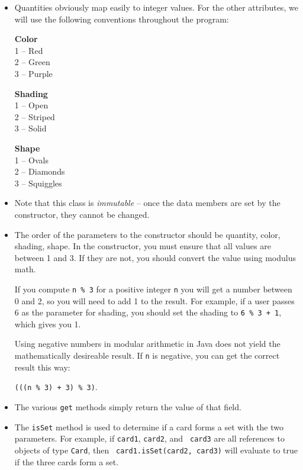 \documentclass[11pt]{article}
\begin{document}
\begin{itemize}
\item Quantities obviously map easily to integer values.  For the other
  attributes, we will use the following conventions throughout the program:

\begin{minipage}{2in}
{\bf Color}\\
1 -- Red\\
2 -- Green\\
3 -- Purple
\end{minipage}
\begin{minipage}{2in}
{\bf Shading}\\
1 -- Open\\
2 -- Striped\\
3 -- Solid
\end{minipage}
\begin{minipage}{2in}
{\bf Shape}\\
1 -- Ovals\\
2 -- Diamonds\\
3 -- Squiggles
\end{minipage}

\item Note that this class is {\em immutable} -- once the data members are set
  by the constructor, they cannot be changed.

\item The order of the parameters to the constructor should be quantity, color,
  shading, shape.  In the constructor, you must ensure that all values are
  between 1 and 3.  If they are not, you should convert the value using
  modulus math.

  If you compute {\tt n \% 3} for a positive integer {\tt n} you will get a
  number between 0 and 2, so you will need to add 1 to the result. For example,
  if a user passes 6 as the parameter for shading, you should set the shading
  to {\tt 6 \% 3 + 1}, which gives you 1.

  Using negative numbers in modular arithmetic in Java does not yield the
  mathematically desireable result. If {\tt n} is negative, you can get the
  correct result this way: 

  {\tt (((n \% 3) + 3) \% 3)}.

\item The various {\tt get} methods simply return the value of that field.

\item The {\tt isSet} method is used to determine if a card forms a set with
  the two parameters.  For example, if {\tt card1}, {\tt card2}, and {\tt
    card3} are all references to objects of type {\tt Card}, then {\tt
    card1.isSet(card2, card3)} will evaluate to true if the three cards form a
  set.


\end{itemize}
\end{document}
